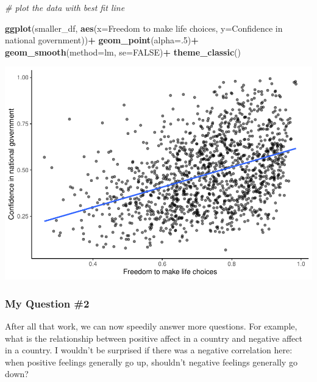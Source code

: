 \documentclass[
]{book}
\newenvironment{Shaded}{\begin{snugshade}}{\end{snugshade}}
\newcommand{\AttributeTok}[1]{\textcolor[rgb]{0.13,0.29,0.53}{#1}}
\newcommand{\CommentTok}[1]{\textcolor[rgb]{0.56,0.35,0.01}{\textit{#1}}}
\newcommand{\ConstantTok}[1]{\textcolor[rgb]{0.56,0.35,0.01}{#1}}
\newcommand{\DecValTok}[1]{\textcolor[rgb]{0.00,0.00,0.81}{#1}}
\newcommand{\FunctionTok}[1]{\textcolor[rgb]{0.13,0.29,0.53}{\textbf{#1}}}
\newcommand{\NormalTok}[1]{#1}
\newcommand{\SpecialCharTok}[1]{\textcolor[rgb]{0.81,0.36,0.00}{\textbf{#1}}}
\newcommand{\StringTok}[1]{\textcolor[rgb]{0.31,0.60,0.02}{#1}}
\begin{document}
\begin{Shaded}
\begin{Highlighting}[]
\CommentTok{\# plot the data with best fit line}

\FunctionTok{ggplot}\NormalTok{(smaller\_df, }\FunctionTok{aes}\NormalTok{(}\AttributeTok{x=}\StringTok{\textasciigrave{}}\AttributeTok{Freedom to make life choices}\StringTok{\textasciigrave{}}\NormalTok{,}
                     \AttributeTok{y=}\StringTok{\textasciigrave{}}\AttributeTok{Confidence in national government}\StringTok{\textasciigrave{}}\NormalTok{))}\SpecialCharTok{+}
  \FunctionTok{geom\_point}\NormalTok{(}\AttributeTok{alpha=}\NormalTok{.}\DecValTok{5}\NormalTok{)}\SpecialCharTok{+}
  \FunctionTok{geom\_smooth}\NormalTok{(}\AttributeTok{method=}\NormalTok{lm, }\AttributeTok{se=}\ConstantTok{FALSE}\NormalTok{)}\SpecialCharTok{+}
  \FunctionTok{theme\_classic}\NormalTok{()}
\end{Highlighting}
\end{Shaded}

\includegraphics{Statistics_Lab_files/figure-latex/unnamed-chunk-290-1.pdf}

\hypertarget{my-question-2}{%
\subsubsection{My Question \#2}\label{my-question-2}}

After all that work, we can now speedily answer more questions. For example, what is the relationship between positive affect in a country and negative affect in a country. I wouldn't be surprised if there was a negative correlation here: when positive feelings generally go up, shouldn't negative feelings generally go down?
\end{document}
